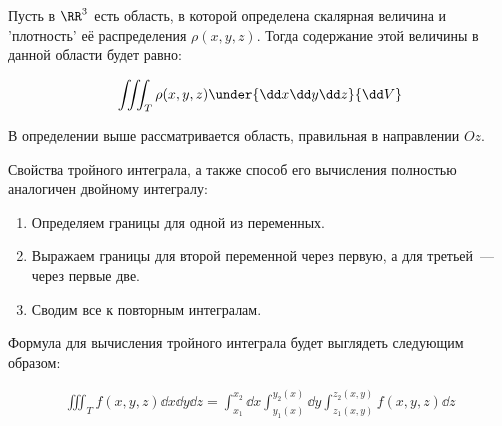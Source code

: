 
Пусть в \(\RR^3\) есть область, в которой определена скалярная величина и
'плотность' её распределения \(\rho(x, y, z)\). Тогда содержание этой величины
в данной области будет равно:

\begin{align*}
  \iiint_{T} \rho(x, y, z) \under{\dd x \dd y \dd z}{\dd V}
\end{align*}

\begin{remark}
  В определении выше рассматривается область, правильная в направлении \(Oz\).
\end{remark}

\begin{remark}
  Свойства тройного интеграла, а также способ его вычисления полностью
  аналогичен двойному интегралу:
  \begin{enumerate}
    \item Определяем границы для одной из переменных.

    \item Выражаем границы для второй переменной через первую, а для третьей~---
    через первые две.

    \item Сводим все к повторным интегралам.
  \end{enumerate}
\end{remark}

Формула для вычисления тройного интеграла будет выглядеть следующим образом:

\begin{align*}
  \iiint_{T} f(x, y, z) \dd x \dd y \dd z
  = \int_{x_{1}}^{x_{2}} \dd x
    \int_{y_{1}(x)}^{y_{2}(x)} \dd y
    \int_{z_{1}(x, y)}^{z_{2}(x, y)} f(x, y, z) \dd z
\end{align*}

